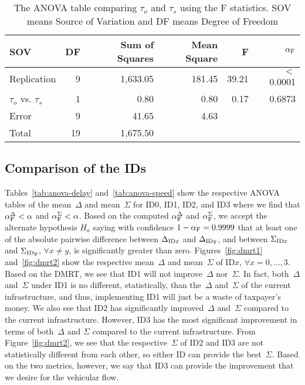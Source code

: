 \documentclass[preprint]{./acm_proc_article-sp}
\begin{document}
\begin{table*}[bth]
\caption{The ANOVA table comparing $\tau_o$ and $\tau_s$ using the F statistics. SOV means Source of Variation and DF means Degree of Freedom}\label{tab:model-validation}
\centering\begin{tabular}{lrrrrr}
\hline\hline
SOV & DF & Sum of Squares & Mean Square & F & $\alpha_{\rm F}$\\
\hline
Replication            & 9  & 1,633.05 & 181.45 & 39.21 & $<$ 0.0001 \\
$\tau_o$ vs. $\tau_s$  & 1  &     0.80 &   0.80 &  0.17 & 0.6873 \\
Error                  & 9  &    41.65 &   4.63 & \\
\hline
Total                  & 19 & 1,675.50 & \\
\hline\hline
\end{tabular}
\end{table*}

\subsection{Comparison of the IDs}

Tables~\ref{tab:anova-delay} and~\ref{tab:anova-speed} show the respective ANOVA tables of the mean~$\Delta$ and mean~$\Sigma$ for ID0, ID1, ID2, and ID3 where we find that $\alpha_{\rm F}^{\Delta} < \alpha$ and $\alpha_{\rm F}^{\Sigma} < \alpha$. Based on the computed $\alpha_{\rm F}^{\Delta}$ and $\alpha_{\rm F}^{\Sigma}$, we accept the alternate hypothesis $H_a$ saying with confidence $1 - \alpha_{\rm F} = 0.9999$ that at least one of the absolute pairwise difference between $\Delta_{{\rm ID}x}$ and $\Delta_{{\rm ID}y}$, and between $\Sigma_{{\rm ID}x}$ and $\Sigma_{{\rm ID}y}$, $\forall x\ne y$, is significantly greater than zero. Figures~\ref{fig:dmrt1} and~\ref{fig:dmrt2} show the respective mean~$\Delta$ and mean~$\Sigma$ of ID$x$, $\forall x=0,\dots,3$. Based on the DMRT, we see that ID1 will not improve~$\Delta$ nor~$\Sigma$. In fact, both~$\Delta$ and~$\Sigma$ under ID1 is no different, statistically, than the~$\Delta$ and~$\Sigma$ of the current infrastructure, and thus, implementing ID1 will just be a waste of taxpayer's money. We also see that ID2 has significantly improved~$\Delta$ and~$\Sigma$ compared to the current infrastructure. However, ID3 has the most significant improvement in terms of both~$\Delta$ and $\Sigma$ compared to the current infrastructure. From Figure~\ref{fig:dmrt2}, we see that the respective~$\Sigma$ of ID2 and ID3 are not statistically different from each other, so either ID can provide the best~$\Sigma$. Based on the two metrics, however, we say that ID3 can provide the improvement that we desire for the vehicular flow.
\end{document}
